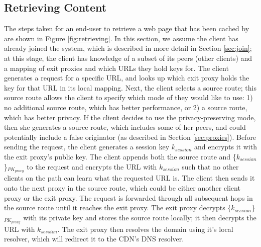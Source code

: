 \subsection{Retrieving Content}
\label{sec:retrieve}
The steps taken for an end-user to retrieve a web page that has been cached by \system{} are shown in Figure \ref{fig:retrieving}.  
In this section, we assume the client has already joined the system, which is described in more detail in Section \ref{sec:join}; at this 
stage, the client has knowledge of a subset of its peers (other \system{} clients) and a mapping of exit proxies and which URLs they hold 
keys for.  The client generates a request for a specific URL, and looks up which exit proxy holds the key for that URL in its local mapping.  Next, 
the client selects a source route; this source route allows the client to specify which mode of \system{} they would like to use: 1) no additional source 
route, which has better performance, or 2) a source route, which has better privacy.  If the client decides to use the privacy-preserving mode, 
then she generates a source route, which includes some of her peers, and could potentially include a false originator (as described in Section \ref{sec:proxies}).
Before sending the request, the client generates a session key $k_{session}$ and encrypts it with the exit proxy's public key.  The client appends both the source route and \{$k_{session}$\}$_{PK_{proxy}}$ to the request and encrypts the URL with $k_{session}$ such that no other clients on the path can learn what the requested URL is.  The client then sends it onto the next proxy in the source route, which could be either another client proxy or the exit proxy.  The request is forwarded 
through all subsequent hops in the source route until it reaches the exit proxy.  The exit proxy decrypts \{$k_{session}$\}$_{PK_{proxy}}$ with its private key and stores 
the source route locally; it then decrypts the URL with $k_{session}$.   The exit proxy then resolves the domain using it's local resolver, which will redirect it to the CDN's DNS resolver. 

